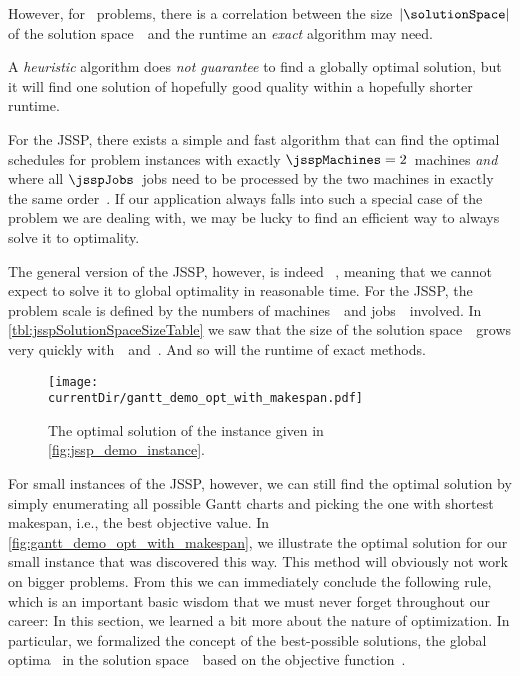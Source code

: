 However, for \NPhard\ problems, there is a correlation between the size~$|\solutionSpace|$ of the solution space~\solutionSpace\ and the runtime an \emph{exact} algorithm may need.%
%
\begin{definition}%
A \emph{heuristic} algorithm does \emph{not guarantee} to find a globally optimal solution, but it will find one solution of hopefully good quality within a hopefully shorter runtime.%
\end{definition}%
%
%
%
%
For the \gls{JSSP}, there exists a simple and fast algorithm that can find the optimal schedules for problem instances with exactly $\jsspMachines=2$~machines \emph{and} where all $\jsspJobs$~jobs need to be processed by the two machines in exactly the same order~\cite{J1954OTATSPSWSTI}.
If our application always falls into such a special case of the problem we are dealing with, we may be lucky to find an efficient way to always solve it to optimality.

The general version of the \gls{JSSP}, however, is indeed \NPhard~\cite{LLRKS1993SASAAC,CPW1998AROMSCAAA}, meaning that we cannot expect to solve it to global optimality in reasonable time.
For the \gls{JSSP}, the problem scale is defined by the numbers of machines~\jsspMachines\ and jobs~\jsspJobs\ involved.
In \autoref{tbl:jsspSolutionSpaceSizeTable} we saw that the size of the solution space~\solutionSpace\ grows very quickly with~\jsspMachines\ and~\jsspJobs.
And so will the runtime of exact methods.

\begin{figure}%
\centering%
\texttt{[image: \\currentDir/gantt\_demo\_opt\_with\_makespan.pdf]}%
\caption{The optimal solution of the  instance given in \autoref{fig:jssp_demo_instance}.}%
\label{fig:gantt_demo_opt_with_makespan}%
\end{figure}

For small instances of the \gls{JSSP}, however, we can still find the optimal solution by simply enumerating all possible Gantt charts and picking the one with shortest makespan, i.e., the best objective value.
In \autoref{fig:gantt_demo_opt_with_makespan}, we illustrate the optimal solution for our small  instance that was discovered this way.
This method will obviously not work on bigger problems.%
%
%
%
From this we can immediately conclude the following rule, which is an important basic wisdom that we must never forget throughout our career:%
%
%
%
\endhsection%
%
%
In this section, we learned a bit more about the nature of optimization.
In particular, we formalized the concept of the best-possible solutions, the global optima~\globalOptimumOf{\solspel} in the solution space~\solutionSpace\ based on the objective function~\objf.

